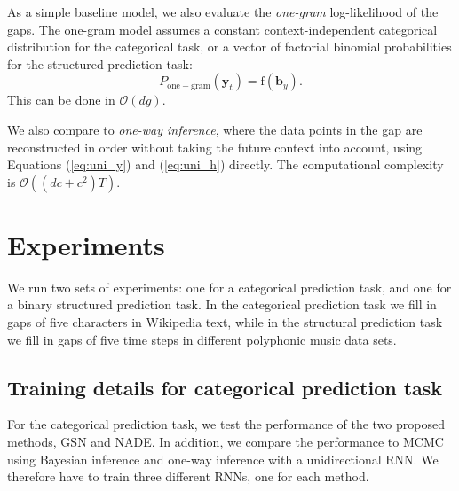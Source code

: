 \documentclass{article}
\begin{document}

As a simple baseline model, we also evaluate the \emph{one-gram} log-likelihood 
of the gaps. The one-gram model assumes a constant context-independent 
categorical distribution for the categorical 
task, or a vector of factorial binomial probabilities for the structured 
prediction task:
\begin{equation*}
P_{\mathrm{one-gram}}\left(\mathbf{y}_t \right) = \mathrm{f} \left( \mathbf{b}_y \right).
\end{equation*}
This can be done in $\mathcal{O}(dg)$.

We also compare to \emph{one-way inference}, where the data points in the gap are 
reconstructed in order without taking the future context into account, using Equations 
(\ref{eq:uni_y}) and (\ref{eq:uni_h}) directly.
The computational complexity is $\mathcal{O}((dc+c^2)T)$.

\section{Experiments}
\label{sec:exp}


We run two sets of experiments: one for a categorical prediction task, and one for a 
binary structured prediction task. In the categorical prediction task we fill in gaps of 
five characters in Wikipedia text, while in the structural prediction task we 
fill in gaps of five time steps in different polyphonic music data sets.

\subsection{Training details for categorical prediction task}
\label{sec:categ_details}

For the categorical prediction task, we test the performance of the two 
proposed methods, GSN and NADE. In addition, we compare the performance to MCMC using Bayesian
inference and one-way inference with a unidirectional RNN. We therefore have to train 
three different RNNs, one for each method.
\end{document}
